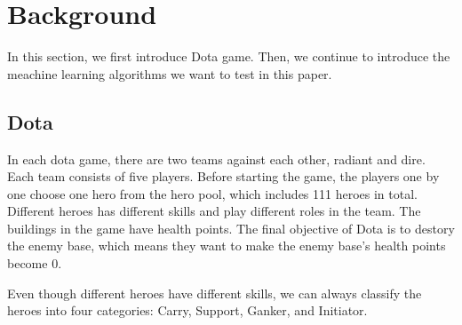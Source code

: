 \section{Background}
In this section, we first introduce Dota game.
Then, we continue to introduce the meachine learning algorithms we want to test in this paper. 

\subsection{Dota}
In each dota game, there are two teams against each other, radiant and dire.
Each team consists of five players.
Before starting the game, the players one by one choose one hero from the hero pool, which includes 111 heroes in total.
Different heroes has different skills and play different roles in the team.
The buildings in the game have health points.
The final objective of Dota is to destory the enemy base, which means they want to make the enemy base's health points become 0. 

Even though different heroes have different skills, we can always classify the heroes into four categories: Carry, Support, Ganker, and Initiator.

